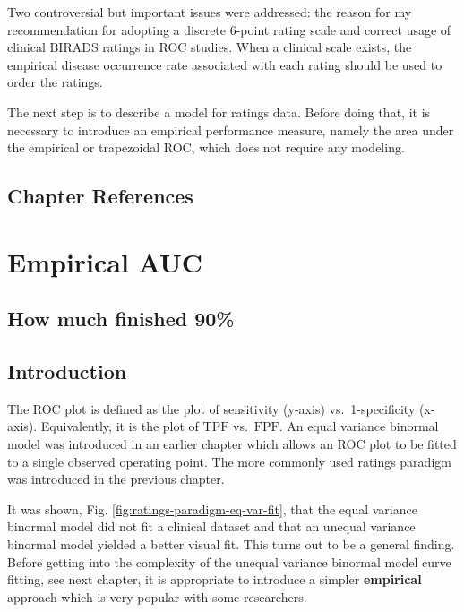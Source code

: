 \documentclass[
]{book}
\begin{document}
Two controversial but important issues were addressed: the reason for my recommendation for adopting a discrete 6-point rating scale and correct usage of clinical BIRADS ratings in ROC studies. When a clinical scale exists, the empirical disease occurrence rate associated with each rating should be used to order the ratings.

The next step is to describe a model for ratings data. Before doing that, it is necessary to introduce an empirical performance measure, namely the area under the empirical or trapezoidal ROC, which does not require any modeling.

\hypertarget{ratings-paradigm-references}{%
\section{Chapter References}\label{ratings-paradigm-references}}

\hypertarget{empirical-auc}{%
\chapter{Empirical AUC}\label{empirical-auc}}

\hypertarget{empirical-auc-how-much-finished}{%
\section{How much finished 90\%}\label{empirical-auc-how-much-finished}}

\hypertarget{empirical-auc-introduction}{%
\section{Introduction}\label{empirical-auc-introduction}}

The ROC plot is defined as the plot of sensitivity (y-axis) vs.~1-specificity (x-axis). Equivalently, it is the plot of \(\text{TPF}\) vs.~\(\text{FPF}\). An equal variance binormal model was introduced in an earlier chapter which allows an ROC plot to be fitted to a single observed operating point. The more commonly used ratings paradigm was introduced in the previous chapter.

It was shown, Fig. \ref{fig:ratings-paradigm-eq-var-fit}, that the equal variance binormal model did not fit a clinical dataset and that an unequal variance binormal model yielded a better visual fit. This turns out to be a general finding. Before getting into the complexity of the unequal variance binormal model curve fitting, see next chapter, it is appropriate to introduce a simpler \textbf{empirical} approach which is very popular with some researchers.
\end{document}
